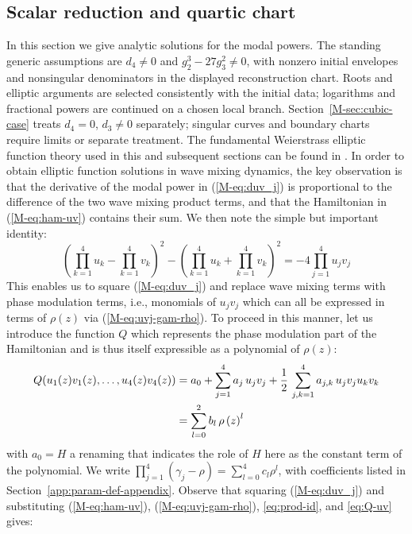 \documentclass[11pt,a4paper]{article}
\newcommand{\externaleqref}[1]{\textup{(\ref*{#1})}}
\begin{document}
\subsection{Scalar reduction and quartic chart}

In this section we give analytic solutions for the modal powers.
The standing generic assumptions are $d_4\ne0$ and $g_2^3-27g_3^2\ne0$, with nonzero initial envelopes and nonsingular denominators in the displayed reconstruction chart.
Roots and elliptic arguments are selected consistently with the initial data; logarithms and fractional powers are continued on a chosen local branch.
Section~\ref*{M-sec:cubic-case} treats $d_4=0$, $d_3\ne0$ separately; singular curves and boundary charts require limits or separate treatment.
The fundamental Weierstrass elliptic function theory used in this and subsequent sections can be found in \cite{whittakerCourseModernAnalysis2021}.
In order to obtain elliptic function solutions in wave mixing dynamics, the key observation is that the derivative of the modal power in \externaleqref{M-eq:duv_j} is proportional to the difference of the two wave mixing product terms, and that the Hamiltonian in \externaleqref{M-eq:ham-uv} contains their sum.
We then note the simple but important identity:
\begin{equation}
\label{eq:prod-id}
\left(\prod\limits_{k=1}^{4} u_k - \prod\limits_{k=1}^{4} v_k\right)^2 - \left(\prod\limits_{k=1}^{4} u_k + \prod\limits_{k=1}^{4} v_k\right)^2 = - 4 \prod\limits_{j=1}^{4} u_j v_j
\end{equation}
This enables us to square \externaleqref{M-eq:duv_j} and replace wave mixing terms with phase modulation terms, i.e., monomials of $u_j v_j$ which can all be expressed in terms of $\rho(z)$ via \externaleqref{M-eq:uvj-gam-rho}.
To proceed in this manner, let us introduce the function $Q$ which represents the phase modulation part of the Hamiltonian and is thus itself expressible as a polynomial of $\rho(z)$:
\begin{align}
Q(u_1(z)v_1(z), \dots, u_4(z)v_4(z)) &= a_0 + \sum_{j=1}^{4} a_{j}\, u_j v_j + \frac{1}{2}\,\sum_{j,k=1}^{4} a_{j,k}\, u_j v_j u_k v_k  \notag  \\
& = \sum_{l=0}^{2}b_l\,\rho\left(z\right)^l \label{eq:Q-uv}
\end{align}
with $a_0=H$ a renaming that indicates the role of $H$ here as the constant term of the polynomial.
We write $\prod_{j=1}^4(\gamma_j-\rho)=\sum_{l=0}^4 c_l\rho^l$, with coefficients listed in Section~\ref{app:param-def-appendix}.
Observe that squaring \externaleqref{M-eq:duv_j} and substituting \externaleqref{M-eq:ham-uv}, \externaleqref{M-eq:uvj-gam-rho}, \eqref{eq:prod-id}, and \eqref{eq:Q-uv} gives:
\end{document}

